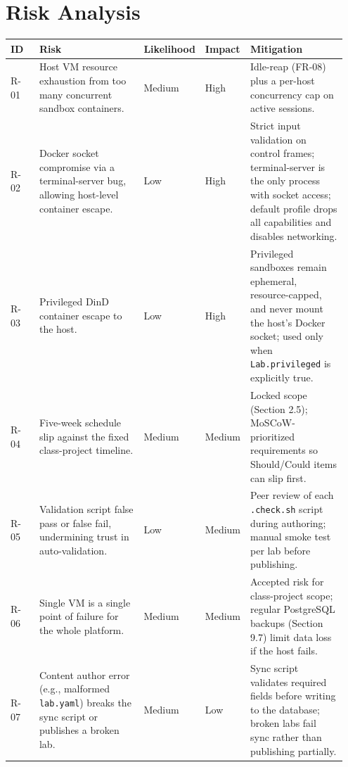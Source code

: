 \documentclass[11pt]{article}
\begin{document}
\section{Risk Analysis}

\begin{longtable}{@{}p{0.09\linewidth}p{0.34\linewidth}p{0.12\linewidth}p{0.10\linewidth}p{0.30\linewidth}@{}}
\toprule
\textbf{ID} & \textbf{Risk} & \textbf{Likelihood} & \textbf{Impact} & \textbf{Mitigation} \\
\midrule
\endhead
R-01 & Host VM resource exhaustion from too many concurrent sandbox
       containers. & Medium & High & Idle-reap (FR-08) plus a
       per-host concurrency cap on active sessions. \\
R-02 & Docker socket compromise via a terminal-server bug, allowing
       host-level container escape. & Low & High & Strict input
       validation on control frames; terminal-server is the only
       process with socket access; default profile drops all
       capabilities and disables networking. \\
R-03 & Privileged DinD container escape to the host. & Low & High &
       Privileged sandboxes remain ephemeral, resource-capped, and
       never mount the host's Docker socket; used only when
       \texttt{Lab.privileged} is explicitly true. \\
R-04 & Five-week schedule slip against the fixed class-project
       timeline. & Medium & Medium & Locked scope (Section 2.5);
       MoSCoW-prioritized requirements so Should/Could items can slip
       first. \\
R-05 & Validation script false pass or false fail, undermining trust
       in auto-validation. & Low & Medium & Peer review of each
       \texttt{.check.sh} script during authoring; manual smoke test
       per lab before publishing. \\
R-06 & Single VM is a single point of failure for the whole
       platform. & Medium & Medium & Accepted risk for class-project
       scope; regular PostgreSQL backups (Section 9.7) limit data
       loss if the host fails. \\
R-07 & Content author error (e.g., malformed \texttt{lab.yaml})
       breaks the sync script or publishes a broken lab. & Medium &
       Low & Sync script validates required fields before writing to
       the database; broken labs fail sync rather than publishing
       partially. \\
\bottomrule
\end{longtable}
\end{document}
